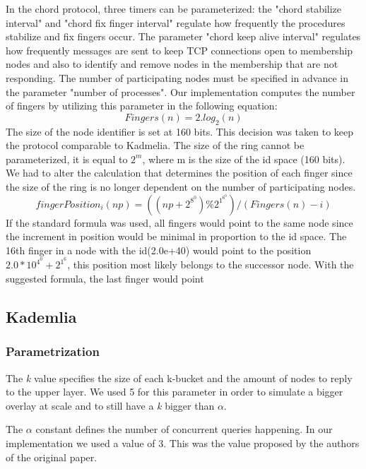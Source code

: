 \documentclass[sigconf]{acmart}
\begin{document}
In the chord protocol, three timers can be parameterized: the "chord stabilize interval" and "chord fix finger interval" regulate how frequently the procedures stabilize and fix fingers occur.
The parameter "chord keep alive interval" regulates how frequently messages are sent to keep TCP connections open to membership nodes and also to identify and remove nodes in the membership that are not responding.
The number of participating nodes must be specified in advance in the parameter "number of processes". Our implementation computes the number of fingers by utilizing this parameter in the following equation: 
\[Fingers (n)=2.log_2(n)\]
The size of the node identifier is set at 160 bits. This decision was taken to keep the protocol comparable to Kadmelia. 
The size of the ring cannot be parameterized, it is equal to $2^m$, where m is the size of the id space (160 bits). 
We had to alter the calculation that determines the position of each finger since the size of the ring is no longer dependent on the number of participating nodes. 
\[ fingerPosition_i(np) = ((np + 2^8^0) \% 2^1^6^0) / (Fingers(n) - i) \]
If the standard formula was used, all fingers would point to the same node since the increment in position would be minimal in proportion to the id space.
The 16th finger in a node with the id(2.0e+40) would point to the position $2.0*10^4^0 + 2^1^6$, this position most likely belongs to the successor node. With the suggested formula, the last finger would point 


\subsection{Kademlia}

\subsubsection{Parametrization}
The \emph{k} value specifies the size of each k-bucket and the amount of nodes to reply to the upper layer. We used 5 for this parameter in order to simulate a bigger overlay at scale and to still have a \emph{k} bigger than $\alpha$.

 The $\alpha$ constant defines the number of concurrent queries happening. In our implementation we used a value of 3. This was the value proposed by the authors of the original paper.
 
\end{document}
